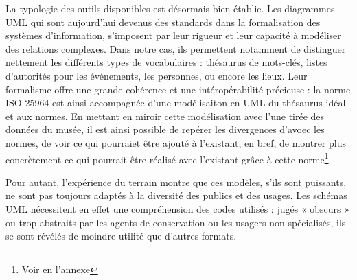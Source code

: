 La typologie des outils disponibles est désormais bien établie. Les diagrammes UML qui sont aujourd'hui devenus des standards dans la formalisation des systèmes d'information, s'imposent par leur rigueur et leur capacité à modéliser des relations complexes. Dans notre cas, ils permettent notamment de distinguer nettement les différents types de vocabulaires : thésaurus de mots-clés, listes d'autorités pour les événements, les personnes, ou encore les lieux. Leur formalisme offre une grande cohérence et une intéropérabilité précieuse : la norme ISO 25964 est ainsi accompagnée d'une modélisaiton en UML du thésaurus idéal et aux normes. En mettant en miroir cette modélisation avec l'une tirée des données du musée, il est ainsi possible de repérer les divergences d'avoec les normes, de voir ce qui pourraiet être ajouté à l'existant, en bref, de montrer plus concrètement ce qui pourrait être réalisé avec l'existant grâce à cette norme\footnote{Voir en l'annexe }.



Pour autant, l'expérience du terrain montre que ces modèles, s'ils sont puissants, ne sont pas toujours adaptés à la diversité des publics et des usages. Les schémas UML nécessitent en effet une compréhension des codes utilisés : jugés « obscurs » ou trop abstraits par les agents de conservation ou les usagers non spécialisés, ils se sont révélés de moindre utilité que d'autres formats. 

